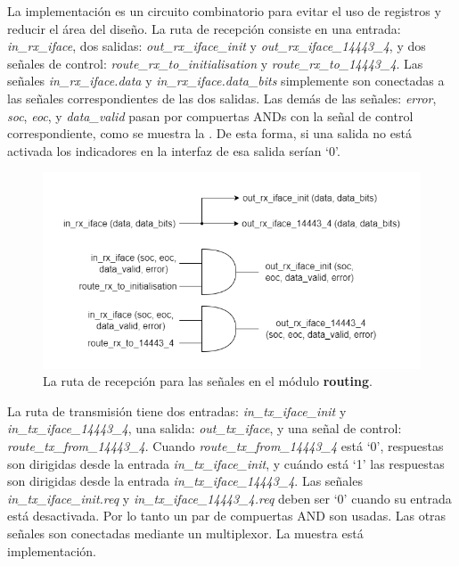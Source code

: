 \documentclass[a4paper, twoside, 11pt]{report}
\begin{document}
La implementación es un circuito combinatorio para evitar el uso de registros y reducir el área del diseño. La ruta de recepción consiste en una entrada: \textit{in\_rx\_iface}, dos salidas: \textit{out\_rx\_iface\_init} y \textit{out\_rx\_iface\_14443\_4}, y dos señales de control: \textit{route\_rx\_to\_initialisation} y \textit{route\_rx\_to\_14443\_4}. Las señales \textit{in\_rx\_iface.data} y \textit{in\_rx\_iface.data\_bits} simplemente son conectadas a las señales correspondientes de las dos salidas. Las demás de las señales: \textit{error}, \textit{soc}, \textit{eoc}, y \textit{data\_valid} pasan por compuertas ANDs con la señal de control correspondiente, como se muestra la . De esta forma, si una salida no está activada los indicadores en la interfaz de esa salida serían ‘0’.

\begin{figure}[htb]
  \centering
  \includegraphics[width=1.0\textwidth]{./img/routing_rx.drawio}
  \caption{La ruta de recepción para las señales en el módulo \textbf{routing}.}
  \label{fig:routing_rx}
\end{figure}

La ruta de transmisión tiene dos entradas: \textit{in\_tx\_iface\_init} y \textit{in\_tx\_iface\_14443\_4}, una salida: \textit{out\_tx\_iface}, y una señal de control: \textit{route\_tx\_from\_14443\_4}. Cuando \textit{route\_tx\_from\_14443\_4} está ‘0’, respuestas son dirigidas desde la entrada \textit{in\_tx\_iface\_init}, y cuándo está ‘1’ las respuestas son dirigidas desde la entrada \textit{in\_tx\_iface\_14443\_4}. Las señales \textit{in\_tx\_iface\_init.req} y \textit{in\_tx\_iface\_14443\_4.req} deben ser ‘0’ cuando su entrada está desactivada. Por lo tanto un par de compuertas AND son usadas. Las otras señales son conectadas mediante un multiplexor. La  muestra está implementación. 
\end{document}
